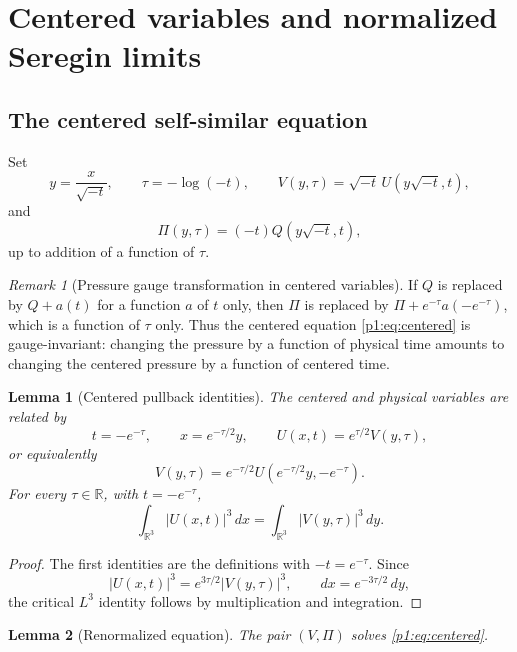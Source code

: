 \documentclass[11pt]{amsart}
\theoremstyle{plain}
\newtheorem{lemma}[lemma]{Lemma}
\theoremstyle{definition}
\theoremstyle{remark}
\newtheorem{remark}[remark]{Remark}
\numberwithin{equation}{section}
\newcommand{\R}{\mathbb R}
\begin{document}
\section{Centered variables and normalized Seregin limits}\label{p1:sec:seregin}

\subsection{The centered self-similar equation}

Set
\[
   y=\frac{x}{\sqrt{-t}},\qquad
   \tau=-\log(-t),\qquad
   V(y,\tau)=\sqrt{-t}\,U(y\sqrt{-t},t),
\]
and
\[
   \Pi(y,\tau)=(-t)Q(y\sqrt{-t},t),
\]
up to addition of a function of \(\tau\).

\begin{remark}[Pressure gauge transformation in centered variables]
\label{p1:rem:centered-gauge}
If \(Q\) is replaced by \(Q+a(t)\) for a function \(a\) of \(t\) only, then
\(\Pi\) is replaced by \(\Pi+e^{-\tau}a(-e^{-\tau})\), which is a function of
\(\tau\) only.  Thus the centered equation \eqref{p1:eq:centered} is
gauge-invariant: changing the pressure by a function of physical time amounts
to changing the centered pressure by a function of centered time.
\end{remark}

\begin{lemma}[Centered pullback identities]
\label{p1:lem:centered-pullback-identities}
The centered and physical variables are related by
\[
   t=-e^{-\tau},\qquad x=e^{-\tau/2}y,\qquad
   U(x,t)=e^{\tau/2}V(y,\tau),
\]
or equivalently
\[
   V(y,\tau)=e^{-\tau/2}U(e^{-\tau/2}y,-e^{-\tau}).
\]
For every \(\tau\in\R\), with \(t=-e^{-\tau}\),
\[
   \int_{\R^3}|U(x,t)|^3\,dx
   =
   \int_{\R^3}|V(y,\tau)|^3\,dy .
\]
\end{lemma}

\begin{proof}
The first identities are the definitions with \(-t=e^{-\tau}\).  Since
\[
   |U(x,t)|^3=e^{3\tau/2}|V(y,\tau)|^3,
   \qquad
   dx=e^{-3\tau/2}\,dy,
\]
the critical \(L^3\) identity follows by multiplication and integration.
\end{proof}

\begin{lemma}[Renormalized equation]\label{p1:lem:renormalized-equation}
The pair \((V,\Pi)\) solves \eqref{p1:eq:centered}.
\end{lemma}
\end{document}
